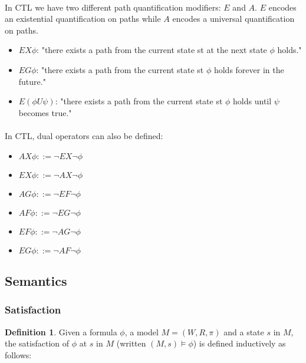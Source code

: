 \documentclass{article}
\theoremstyle{plain}
\theoremstyle{definition}
\newtheorem{defn}[thm]{Definition} %
\begin{document}
\begin{multicols}{2}
\paragraph{} In CTL we have two different path quantification modifiers: $E$ and $A$. $E$ encodes an existential quantification on paths while $A$ encodes a universal quantification on paths. 

\begin{itemize}
\item $EX\phi$: "there exists a path from the current state st at the next state $\phi$ holds."
\item $EG\phi$: "there exists a path from the current state st $\phi$ holds forever in the future."
\item $E(\phi U\psi)$: "there exists a path from the current state st $\phi$ holds until $\psi$ becomes true."
\end{itemize}

\paragraph{} In CTL, dual operators can also be defined: 
\begin{itemize}
\item $AX\phi ::= \lnot EX \lnot\phi$
\item $EX\phi ::= \lnot AX \lnot\phi$
\item $AG\phi ::= \lnot EF \lnot\phi$
\item $AF\phi ::= \lnot EG \lnot\phi$
\item $EF\phi ::= \lnot AG \lnot\phi$
\item $EG\phi ::= \lnot AF \lnot\phi$
\end{itemize}

\subsection{Semantics}
\subsubsection{Satisfaction}
\begin{defn}
Given a formula $\phi$, a model $M = (W, R, \pi)$ and a state $s$ in $M$, the satisfaction of $\phi$ at $s$ in $M$ (written $(M, s) \models \phi$) is defined inductively as follows:
\end{defn}


\end{multicols}
\end{document}
